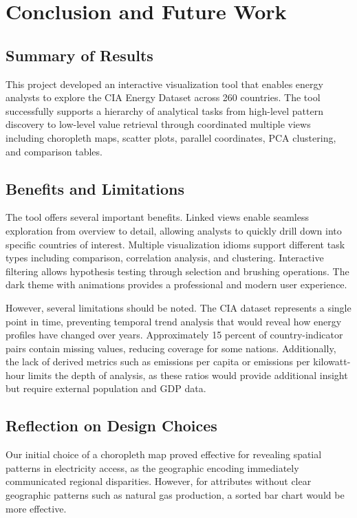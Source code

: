 \documentclass[conference]{IEEEtran}
\begin{document}
\section{Conclusion and Future Work}

\subsection{Summary of Results}

This project developed an interactive visualization tool that enables energy analysts to explore the CIA Energy Dataset across 260 countries. The tool successfully supports a hierarchy of analytical tasks from high-level pattern discovery to low-level value retrieval through coordinated multiple views including choropleth maps, scatter plots, parallel coordinates, PCA clustering, and comparison tables.

\subsection{Benefits and Limitations}

The tool offers several important benefits. Linked views enable seamless exploration from overview to detail, allowing analysts to quickly drill down into specific countries of interest. Multiple visualization idioms support different task types including comparison, correlation analysis, and clustering. Interactive filtering allows hypothesis testing through selection and brushing operations. The dark theme with animations provides a professional and modern user experience.

However, several limitations should be noted. The CIA dataset represents a single point in time, preventing temporal trend analysis that would reveal how energy profiles have changed over years. Approximately 15 percent of country-indicator pairs contain missing values, reducing coverage for some nations. Additionally, the lack of derived metrics such as emissions per capita or emissions per kilowatt-hour limits the depth of analysis, as these ratios would provide additional insight but require external population and GDP data.

\subsection{Reflection on Design Choices}

Our initial choice of a choropleth map proved effective for revealing spatial patterns in electricity access, as the geographic encoding immediately communicated regional disparities. However, for attributes without clear geographic patterns such as natural gas production, a sorted bar chart would be more effective.
\end{document}
